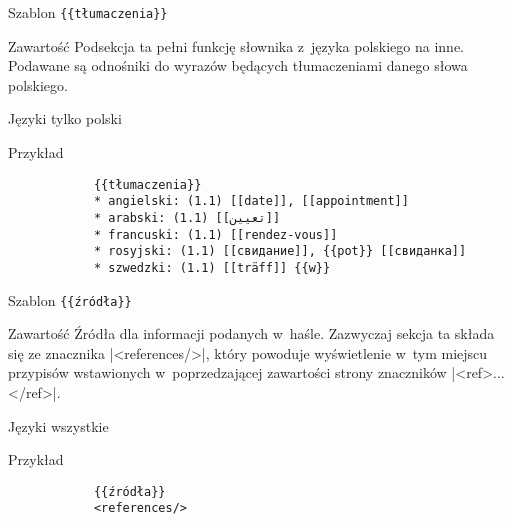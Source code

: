 \spacer
\begin{opis}
	\item[Szablon] \verb|{{tłumaczenia}}|
	\item[Zawartość] Podsekcja ta pełni funkcję słownika z~języka polskiego na inne. Podawane są odnośniki do wyrazów będących tłumaczeniami danego słowa polskiego.
	\item[Języki] tylko polski
	\item[Przykład]
		\begin{verbatim}
			{{tłumaczenia}}
			* angielski: (1.1) [[date]], [[appointment]]
			* arabski: (1.1) [[تعيين]]
			* francuski: (1.1) [[rendez-vous]]
			* rosyjski: (1.1) [[свидание]], {{pot}} [[свиданка]]
			* szwedzki: (1.1) [[träff]] {{w}}
		\end{verbatim}
\end{opis}
\spacer
\begin{opis}
	\item[Szablon] \verb|{{źródła}}|
	\item[Zawartość] Źródła dla informacji podanych w~haśle. Zazwyczaj sekcja ta składa się ze znacznika \kod|<references/>|, który powoduje wyświetlenie w~tym miejscu przypisów wstawionych w~poprzedzającej zawartości strony znaczników \kod|<ref>...</ref>|.
	\item[Języki] wszystkie
	\item[Przykład]
		\begin{verbatim}
			{{źródła}}
			<references/>
		\end{verbatim}
\end{opis}
